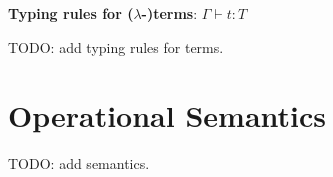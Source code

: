 \documentclass[12pt]{article}
\begin{document}
\noindent \textbf{Typing rules for ($\lambda$-)terms}: $\boxed{\Gamma\vdash t:T}$

{\color{red} TODO: add typing rules for terms.}


\section{Operational Semantics}
{\color{red} TODO: add semantics.}
\end{document}
